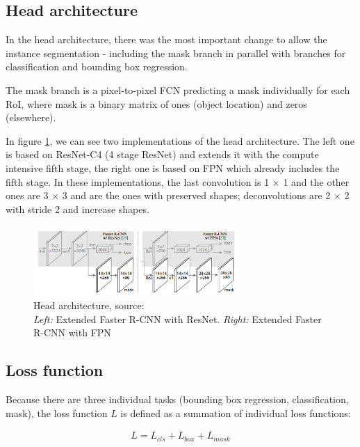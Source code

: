 \documentclass[journal, onecolumn, a4paper]{IEEEtran}
\begin{document}
\subsection{Head architecture}

In the head architecture, there was the most important change to allow the instance segmentation - including the mask branch in parallel with branches for classification and bounding box regression. 

The mask branch is a pixel-to-pixel FCN predicting a mask individually for each RoI, where mask is a binary matrix of ones (object location) and zeros (elsewhere). 

In figure \ref{fig:mask-rcnn-head}, we can see two implementations of the head architecture. The left one is based on ResNet-C4 (4 stage ResNet) and extends it with the compute intensive fifth stage, the right one is based on FPN which already includes the fifth stage. In these implementations, the last convolution is 1 $\times$ 1 and the other ones are 3 $\times$ 3 and are the ones with preserved shapes; deconvolutions are 2 $\times$ 2 with stride 2 and increase shapes. 

\begin{figure}[h] \centering
	\includegraphics[width=0.7\textwidth]{maskrcnn-head}
	\caption[caption]{Head architecture, source: \cite{mask-rcnn} \\ \textit{Left:} Extended Faster R-CNN with ResNet. \textit{Right:} Extended Faster R-CNN with FPN \endtabular}
	\label{fig:mask-rcnn-head}
\end{figure}

\subsection{Loss function}

Because there are three individual tasks (bounding box regression, classification, mask), the loss function $L$ is defined as a summation of individual loss functions: 

\begin{gather*}
L = L_{cls} + L_{box} + L_{mask}
\end{gather*}
\end{document}
